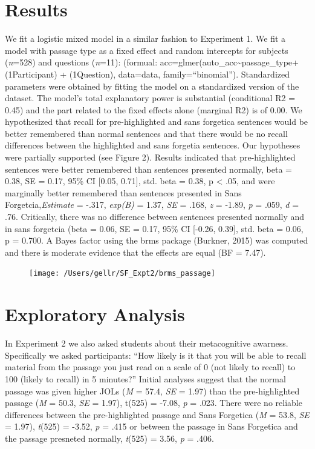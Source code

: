 \documentclass[pdf]{apa6}
\begin{document}
\hypertarget{results-1}{%
\section{Results}\label{results-1}}

We fit a logistic mixed model in a similar fashion to Experiment 1. We fit a model with passage type as a fixed effect and random intercepts for subjects (\emph{n}=528) and questions (\emph{n}=11): (formual: acc=glmer(auto\_acc\textasciitilde{}passage\_type+(1\textbar{}Participant) + (1\textbar{}Question), data=data, family=\enquote{binomial}). Standardized parameters were obtained by fitting the model on a standardized version of the dataset. The model's total explanatory power is substantial (conditional R2 = 0.45) and the part related to the fixed effects alone (marginal R2) is of 0.00. We hypothesized that recall for pre-highlighted and sans forgetica sentences would be better remembered than normal sentences and that there would be no recall differences between the highlighted and sans forgetia sentences. Our hypotheses were partially supported (see Figure 2). Results indicated that pre-highlighted sentences were better remembered than sentences presented normally, beta = 0.38, SE = 0.17, 95\% CI {[}0.05, 0.71{]}, std. beta = 0.38, p \textless{} .05, and were marginally better remembered than sentences presented in Sans Forgetcia,\emph{Estimate} = -.317, \emph{exp(B)} = 1.37, \emph{SE} = .168, \emph{z} = -1.89, \emph{p} = .059, \emph{d} = .76. Critically, there was no difference between sentences presented normally and in sans forgetcia (beta = 0.06, SE = 0.17, 95\% CI {[}-0.26, 0.39{]}, std. beta = 0.06, p = 0.700. A Bayes factor using the brms package (Burkner, 2015) was computed and there is moderate evidence that the effects are equal (BF = 7.47).

\begin{figure}
\texttt{[image: /Users/gellr/SF\_Expt2/brms\_passage]} \caption{ }\label{fig:unnamed-chunk-4}
\end{figure}

\hypertarget{exploratory-analysis}{%
\section{Exploratory Analysis}\label{exploratory-analysis}}

In Experiment 2 we also asked students about their metacognitive awarness. Specifically we asked participants: \enquote{How likely is it that you will be able to recall material from the passage you just read on a scale of 0 (not likely to recall) to 100 (likely to recall) in 5 minutes?} Initial analyses suggest that the normal passage was given higher JOLs (\emph{M} = 57.4, \emph{SE} = 1.97) than the pre-highlighted passage (\emph{M} = 50.3, \emph{SE} = 1.97), t(525) = -7.08, \emph{p} = .023. There were no reliable differences between the pre-highlighted passage and Sans Forgetica (\emph{M} = 53.8, \emph{SE} = 1.97), \emph{t}(525) = -3.52, \emph{p} = .415 or between the passage in Sans Forgetica and the passage presneted normally, \emph{t}(525) = 3.56, \emph{p} = .406.
\end{document}
